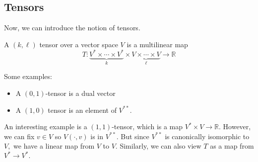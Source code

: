 \documentclass{article}
\numberwithin{equation}{section}
\begin{document}
\subsection{Tensors}
Now, we can introduce the notion of tensors.
\begin{definition}
    A $(k,\ell)$ tensor over a vector space $V$ is a multilinear map
    \begin{equation*}
        T: \underbrace{V^* \times \cdots \times V^*}_{k} \times \underbrace{V\times \cdots \times V}_{\ell} \to \mathbb{R}
    \end{equation*}
\end{definition}
Some examples:
\begin{itemize}
    \item A $(0,1)$-tensor is a dual vector
    \item A $(1,0)$ tensor is an element of $V^{**}.$
\end{itemize}
An interesting example is a $(1,1)$-tensor, which is a map $V^*\times V\to \mathbb{R}.$ However, we can fix $v\in V$ so $V(\cdot, v)$ is in $V^{**}.$ But since $V^{**}$ is canonically isomorphic to $V,$ we have a linear map from $V$ to $V.$ Similarly, we can also view $T$ as a map from $V^*\to V^*.$
\end{document}
